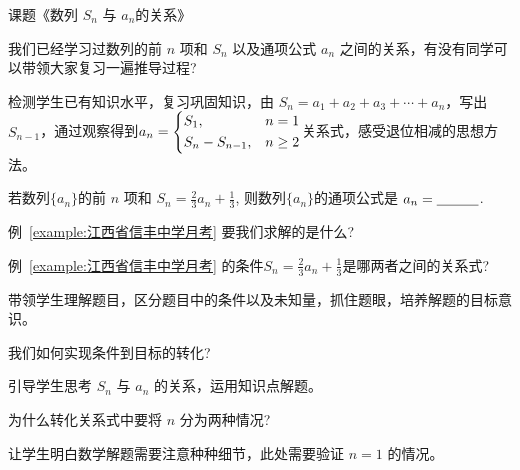 课题《数列 $S_n$ 与 $a_n$的关系》

\begin{question}
  我们已经学习过数列的前 $n$ 项和 $S_n$ 以及通项公式 $a_n$ 之间的关系，有没有同学可以带领大家复习一遍推导过程?
\end{question}

\begin{designgoal}
  检测学生已有知识水平，复习巩固知识，由 $S_n=a_1+a_2+a_3+ \cdots +a_n$，写出 $S_{n-1}$，通过观察得到$a_n= 
  \begin{dcases}
    S_1, & n = 1\\
    S_n - S_{n-1}, & n\geq 2
  \end{dcases}
$关系式，感受退位相减的思想方法。
\end{designgoal}

\begin{example}[2020·江西省信丰中学月考]\label{example:江西省信丰中学月考}
  若数列$\{a_n\}$的前 $n$ 项和 $S_{n}=\frac{2}{3} a_{n}+\frac{1}{3}$, 则数列$\{a_n\}$的通项公式是 $a_{n}= \underline{\hspace*{3em}}$.
\end{example}


\begin{question}
  例~\ref{example:江西省信丰中学月考} 要我们求解的是什么?
\end{question}

\begin{question}
  例~\ref{example:江西省信丰中学月考} 的条件$S_{n}=\frac{2}{3} a_{n}+\frac{1}{3}$是哪两者之间的关系式?
\end{question}


\begin{designgoal}
  带领学生理解题目，区分题目中的条件以及未知量，抓住题眼，培养解题的目标意识。
\end{designgoal}

\begin{question}
  我们如何实现条件到目标的转化?
\end{question}

\begin{designgoal}
  引导学生思考 $S_n$ 与 $a_n$ 的关系，运用知识点解题。
\end{designgoal}

\begin{question}
  为什么转化关系式中要将 $n$ 分为两种情况?
\end{question}

\begin{designgoal}
  让学生明白数学解题需要注意种种细节，此处需要验证 $n=1$ 的情况。
\end{designgoal}

